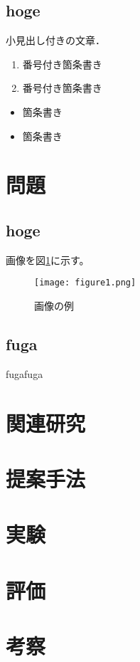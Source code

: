\documentclass[a4j,10pt]{jsarticle}
\begin{document}
\subsection{hoge}

小見出し付きの文章．

\begin{enumerate}
\item 番号付き箇条書き 
\item 番号付き箇条書き
\end{enumerate}

\begin{itemize}
\item 箇条書き
\item 箇条書き
\end{itemize}


\section{問題}

\subsection{hoge}
画像を図\ref{sample}に示す。

\begin{figure}[htbp]
    \begin{center}
        \texttt{[image: figure1.png]}
        \caption{画像の例}
        \label{sample}
    \end{center}
\end{figure}
 
\subsection{fuga}
fugafuga

\section{関連研究}

\section{提案手法}
\section{実験}
\section{評価}

\section{考察}



\end{document}
